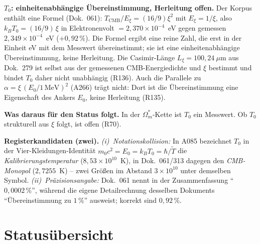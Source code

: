 \textbf{$T_0$: einheitenabhängige Übereinstimmung, Herleitung
offen.} Der Korpus enthält eine Formel (Dok.~061):
$T_\text{CMB}/E_\xi = (16/9)\xi^2$ mit $E_\xi = 1/\xi$, also
$k_BT_0 = (16/9)\,\xi$ in Elektronenvolt $= 2{,}370\times10^{-4}$~eV
gegen gemessen $2{,}349\times10^{-4}$~eV ($+0{,}92\,\%$). Die Formel
ergibt eine reine Zahl, die erst in der Einheit eV mit dem Messwert
übereinstimmt; sie ist eine einheitenabhängige Übereinstimmung,
keine Herleitung. Die Casimir-Länge $L_\xi = 100{,}24~\mu$m aus
Dok.~279 ist selbst aus der gemessenen CMB-Energiedichte und $\xi$
bestimmt und bindet $T_0$ daher nicht unabhängig (R136). Auch die
Parallele zu $\alpha = \xi\,(E_0/1\,\text{MeV})^2$ (A266) trägt
nicht: Dort ist die Übereinstimmung eine Eigenschaft des Ankers
$E_0$, keine Herleitung (R135).

\textbf{Was daraus für den Status folgt.} In der
$\Omega_m^{*}$-Kette ist $T_0$ ein Messwert. Ob $T_0$ strukturell
aus $\xi$ folgt, ist offen (R70).

\textbf{Registerkandidaten (zwei).} \emph{(i)~Notationskollision:}
In A085 bezeichnet $T_0$ in der Vier-Kleidungen-Identität
$m_0c^2 = E_0 = k_BT_0 = \hbar/\tilde T$ die
\emph{Kalibrierungstemperatur} ($8{,}53\times10^{10}$~K), in
Dok.~061/313 dagegen den \emph{CMB-Monopol} ($2{,}7255$~K) -- zwei
Größen im Abstand $3\times10^{10}$ unter demselben Symbol.
\emph{(ii)~Präzisionsangabe:} Dok.~061 nennt in der Zusammenfassung
\enquote{$0{,}0002\,\%$}, während die eigene Detailrechnung
desselben Dokuments \enquote{Übereinstimmung zu $1\,\%$} ausweist;
korrekt sind $0{,}92\,\%$.

\chapter{Statusübersicht}

